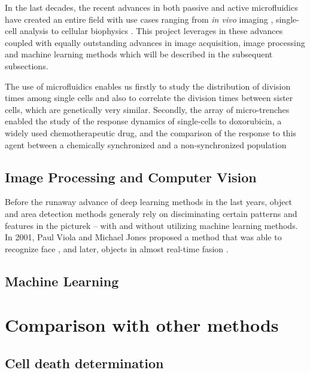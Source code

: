 \documentclass[pdftex,12pt,a4paper]{report}
\begin{document}
In the last decades, the recent advances in both passive and active microfluidics have created an entire field \cite{whitesides2006origins} with use cases ranging from \textit{in vivo} imaging \cite{chronis2007microfluidics}, single-cell analysis \cite{wheeler2003microfluidic} to cellular biophysics \cite{di2010bacterial}. This project leverages in these advances coupled with equally outstanding advances in image acquisition, image processing and machine learning methods which will be described in the subsequent subsections.

The use of microfluidics enables us firstly to study the distribution of division times among single cells and also to correlate the division times between sister cells, which are genetically very similar. Secondly, the array of micro-trenches enabled the study of the response dynamics of single-cells to doxorubicin, a widely used chemotherapeutic drug, and the comparison of the response to this agent between a chemically synchronized and a non-synchronized population

\subsection{Image Processing and Computer Vision}

\label{subsection:cv_advances}

Before the runaway advance of deep learning methods in the last years, object and area detection methods generaly rely on disciminating certain patterns and features in the picturek -- with and without utilizing machine learning methods. In 2001, Paul Viola and Michael Jones proposed a method that was able to recognize face \cite{viola2004robust}, and later, objects in almost real-time fasion \cite{viola2001rapid}. %


\subsection{Machine Learning}

\label{subsection:ml_advances}


\section{Comparison with other methods}

\subsection{Cell death determination}
\label{subsection:comp_cell_death_determination}
\end{document}
